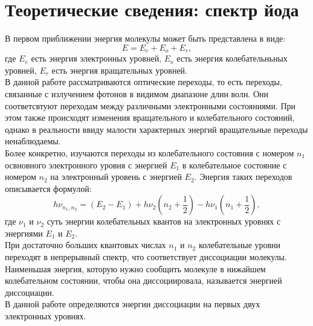 \documentclass[a4paper, 12pt]{article}
\begin{document}
\section*{Теоретические сведения: спектр йода}
В первом приближении энергия молекулы может быть представлена в виде:
\begin{equation}
E=E_e+E_o+E_r,
\end{equation}
где $E_e$ есть энергия электронных уровней, $E_o$ есть энергия колебательньных уровней, $E_r$ есть энергия вращательных уровней.\\
В данной работе рассматриваются оптические переходы, то есть переходы, связанные с излучением фотонов в видимом диапазоне длин волн. Они соответсвтуют переходам между различными электронными состояниями. При этом также происходят изменения вращательного и колебательного состояний, однако в реальности ввиду малости характерных энергий вращательные переходы ненаблюдаемы.\\
Более конкретно, изучаются переходы из колебательного состояния с номером $n_1$ освновного электронного уровня с энергией $E_1$ в колебательное состояние с номером $n_2$ на электронный уровень с энергией $E_2$. Энергия таких переходов описывается формулой:
\begin{equation}
h \nu_{n_1,n_2}=(E_2-E_1)+h\nu_2(n_2+\dfrac{1}{2})-h \nu_1(n_1+\dfrac{1}{2}),
\end{equation}
где $\nu_1$ и $\nu_2$ суть энергии колебательных квантов на электронных уровнях с энергиями $E_1$ и $E_2$.\\
При достаточно больших квантовых числах $n_1$ и $n_2$ колебательные уровни переходят в непрерывный спектр, что соответствует диссоциации молекулы. Наименьшая энергия, которую нужно сообщить молекуле в нижайшем колебательном состоянии, чтобы она диссоциировала, называется энергией диссоциации.\\
В данной работе определяются энергии диссоциации на первых двух электронных уровнях.
\end{document}
